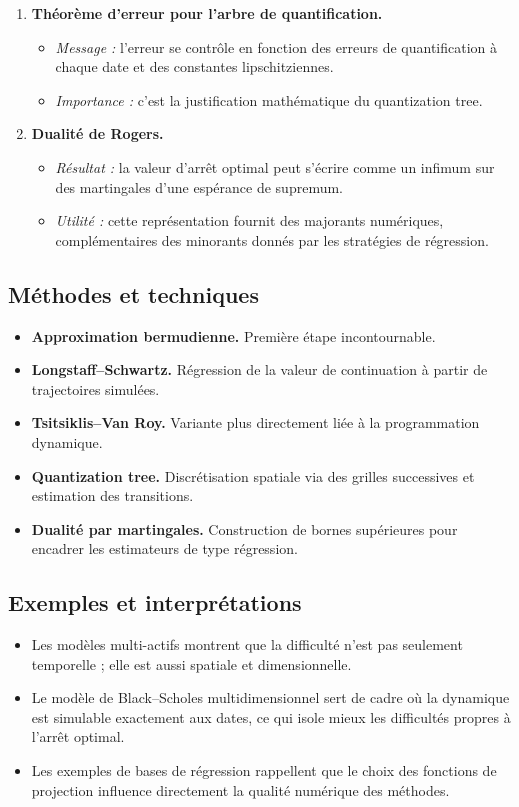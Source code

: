\documentclass[11pt,a4paper]{article}
\begin{document}
\begin{enumerate}[label=\textbf{\arabic*.}]
  \item \textbf{Théorème d'erreur pour l'arbre de quantification.}
  \begin{itemize}
    \item \emph{Message :} l'erreur se contrôle en fonction des erreurs de quantification à chaque date et des constantes lipschitziennes.
    \item \emph{Importance :} c'est la justification mathématique du quantization tree.
  \end{itemize}

  \item \textbf{Dualité de Rogers.}
  \begin{itemize}
    \item \emph{Résultat :} la valeur d'arrêt optimal peut s'écrire comme un infimum sur des martingales d'une espérance de supremum.
    \item \emph{Utilité :} cette représentation fournit des majorants numériques, complémentaires des minorants donnés par les stratégies de régression.
  \end{itemize}
\end{enumerate}

\subsection{Méthodes et techniques}

\begin{itemize}
  \item \textbf{Approximation bermudienne.} Première étape incontournable.
  \item \textbf{Longstaff--Schwartz.} Régression de la valeur de continuation à partir de trajectoires simulées.
  \item \textbf{Tsitsiklis--Van Roy.} Variante plus directement liée à la programmation dynamique.
  \item \textbf{Quantization tree.} Discrétisation spatiale via des grilles successives et estimation des transitions.
  \item \textbf{Dualité par martingales.} Construction de bornes supérieures pour encadrer les estimateurs de type régression.
\end{itemize}

\subsection{Exemples et interprétations}

\begin{itemize}
  \item Les modèles multi-actifs montrent que la difficulté n'est pas seulement temporelle ; elle est aussi spatiale et dimensionnelle.
  \item Le modèle de Black--Scholes multidimensionnel sert de cadre où la dynamique est simulable exactement aux dates, ce qui isole mieux les difficultés propres à l'arrêt optimal.
  \item Les exemples de bases de régression rappellent que le choix des fonctions de projection influence directement la qualité numérique des méthodes.
\end{itemize}
\end{document}
